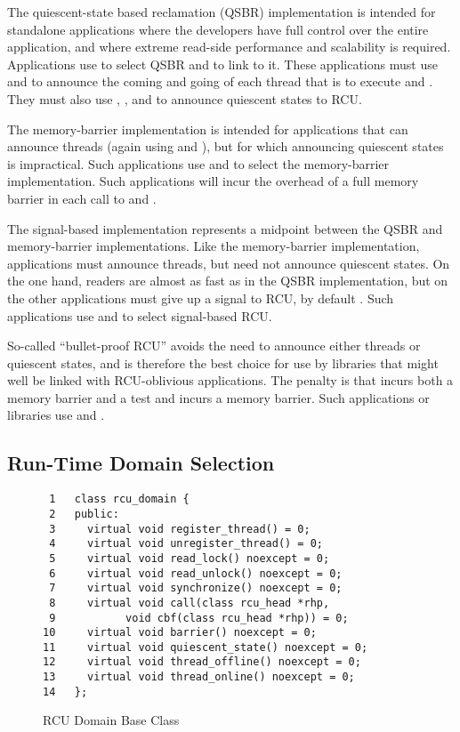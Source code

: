 \documentclass[letterpaper,twocolumn,10pt]{article}
\begin{document}
The quiescent-state based reclamation (QSBR) implementation is intended
for standalone applications where the developers have full control
over the entire application, and where extreme read-side performance
and scalability is required.
Applications use  to select QSBR and
 to link to it.
These applications must use  and
 to announce the coming and going
of each thread that is to execute  and
.
They must also use , ,
and  to announce quiescent states to RCU.

The memory-barrier implementation is intended for applications that
can announce threads (again using  and
), but for which announcing quiescent states is
impractical.
Such applications use  and
 to select the memory-barrier implementation.
Such applications will incur the overhead of a full memory barrier in
each call to  and .

The signal-based implementation represents a midpoint between the QSBR
and memory-barrier implementations.
Like the memory-barrier implementation, applications must announce
threads, but need not announce quiescent states.
On the one hand, readers are almost as fast as in the QSBR implementation,
but on the other applications must give up a signal to RCU, by default
.
Such applications use  and
 to select signal-based RCU.

So-called ``bullet-proof RCU'' avoids the need to announce either threads
or quiescent states, and is therefore the best choice for use by
libraries that might well be linked with RCU-oblivious applications.
The penalty is that  incurs both a memory barrier
and a test and  incurs a memory barrier.
Such applications or libraries use  and
.

\subsection{Run-Time Domain Selection}
\label{sec:Run-Time Domain Selection}

\begin{figure}[tbp]
{ \scriptsize
\begin{verbatim}
 1   class rcu_domain {
 2   public:
 3     virtual void register_thread() = 0;
 4     virtual void unregister_thread() = 0;
 5     virtual void read_lock() noexcept = 0;
 6     virtual void read_unlock() noexcept = 0;
 7     virtual void synchronize() noexcept = 0;
 8     virtual void call(class rcu_head *rhp,
 9           void cbf(class rcu_head *rhp)) = 0;
10     virtual void barrier() noexcept = 0;
11     virtual void quiescent_state() noexcept = 0;
12     virtual void thread_offline() noexcept = 0;
13     virtual void thread_online() noexcept = 0;
14   };
\end{verbatim}
}
\caption{RCU Domain Base Class}
\label{fig:RCU Domain Base Class}
\end{figure}
\end{document}
